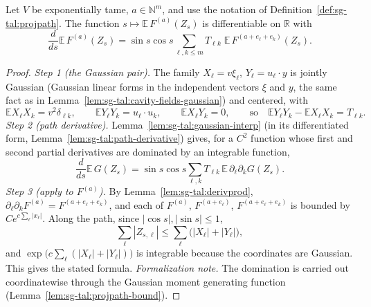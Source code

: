 \begin{theorem}
\label{thm:sg-tal:projpath-deriv}
  \leanok
{}
Let $V$ be exponentially tame, $a\in\mathbb N^m$, and use the notation of Definition~\ref{def:sg-tal:projpath}.  The function
$s\mapsto\mathbb E\,F^{(a)}(Z_s)$ is differentiable on $\mathbb R$ with
\[
\frac{d}{ds}\mathbb E\,F^{(a)}(Z_s)=\sin s\cos s\sum_{\ell,k\le m}T_{\ell k}\;\mathbb E\,F^{(a+e_\ell+e_k)}(Z_s).
\]
\end{theorem}
\begin{proof}
  \leanok
\emph{Step 1 (the Gaussian pair).} The family $X_\ell=v\xi_\ell$, $Y_\ell=u_\ell\cdot y$ is jointly Gaussian (Gaussian linear forms in the independent vectors $\xi$ and $y$, the same fact as in Lemma~\ref{lem:sg-tal:cavity-fields-gaussian}) and centered, with
\[
\mathbb EX_\ell X_k=v^2\delta_{\ell k},\qquad\mathbb EY_\ell Y_k=u_\ell\cdot u_k,\qquad\mathbb EX_\ell Y_k=0,\qquad\text{so}\quad\mathbb EY_\ell Y_k-\mathbb EX_\ell X_k=T_{\ell k}.
\]
\emph{Step 2 (path derivative).} Lemma~\ref{lem:sg-tal:gaussian-interp} (in its differentiated form, Lemma~\ref{lem:sg-tal:path-derivative}) gives, for a $C^2$ function whose first and second partial derivatives are dominated by an integrable function,
\[
\frac d{ds}\mathbb E\,G(Z_s)=\sin s\cos s\sum_{\ell,k}T_{\ell k}\,\mathbb E\,\partial_\ell\partial_kG(Z_s).
\]
\emph{Step 3 (apply to $F^{(a)}$).} By Lemma~\ref{lem:sg-tal:derivprod}, $\partial_\ell\partial_kF^{(a)}=F^{(a+e_\ell+e_k)}$, and each of $F^{(a)}$, $F^{(a+e_\ell)}$, $F^{(a+e_\ell+e_k)}$ is bounded by $Ce^{c\sum_\ell|x_\ell|}$. Along the path, since $|\cos s|,|\sin s|\le1$,
\[
\sum_\ell|Z_{s,\ell}|\le\sum_\ell\big(|X_\ell|+|Y_\ell|\big),
\]
and $\exp\big(c\sum_\ell(|X_\ell|+|Y_\ell|)\big)$ is integrable because the coordinates are Gaussian. This gives the stated formula.
\emph{Formalization note.}  The domination is carried out coordinatewise through the Gaussian moment generating function (Lemma~\ref{lem:sg-tal:projpath-bound}).
\end{proof}

